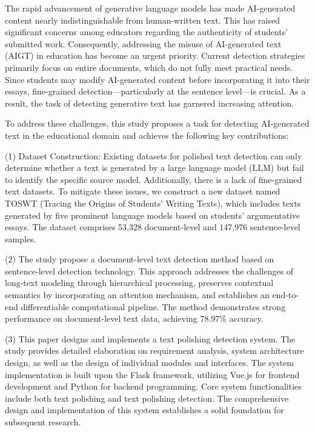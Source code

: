 \begin{abstractEn}
  The rapid advancement of generative language models has made AI-generated content nearly indistinguishable from human-written text. This has raised significant concerns among educators regarding the authenticity of students' submitted work. Consequently, addressing the misuse of AI-generated text (AIGT) in education has become an urgent priority. Current detection strategies primarily focus on entire documents, which do not fully meet practical needs. Since students may modify AI-generated content before incorporating it into their essays, fine-grained detection---particularly at the sentence level---is crucial. As a result, the task of detecting generative text has garnered increasing attention.
  
  To address these challenges, this study proposes a task for detecting AI-generated text in the educational domain and achieves the following key contributions:
  
  (1) Dataset Construction: Existing datasets for polished text detection can only determine whether a text is generated by a large language model (LLM) but fail to identify the specific source model. Additionally, there is a lack of fine-grained text datasets. To mitigate these issues, we construct a new dataset named TOSWT (Tracing the Origins of Students' Writing Texts), which includes texts generated by five prominent language models based on students' argumentative essays. The dataset comprises 53,328 document-level and 147,976 sentence-level samples.
  
  (2) The study propose a document-level text detection method based on sentence-level detection technology. This approach addresses the challenges of long-text modeling through hierarchical processing, preserves contextual semantics by incorporating an attention mechanism, and establishes an end-to-end differentiable computational pipeline. The method demonstrates strong performance on document-level text data, achieving 78.97\% accuracy.
  
  (3) This paper designs and implements a text polishing detection system. The study provides detailed elaboration on requirement analysis, system architecture design, as well as the design of individual modules and interfaces. The system implementation is built upon the Flask framework, utilizing Vue.js for frontend development and Python for backend programming. Core system functionalities include both text polishing and text polishing detection. The comprehensive design and implementation of this system establishes a solid foundation for subsequent research.
\end{abstractEn}
